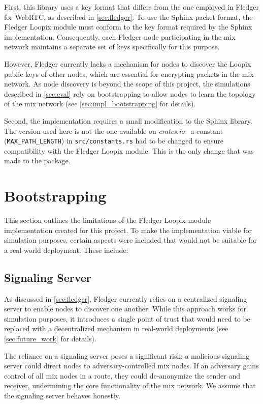 \documentclass[a4paper,11pt,oneside]{report}
\begin{document}
First, this library uses a key format that differs from the one employed in Fledger for WebRTC, as described in \autoref{sec:fledger}. To use the Sphinx packet format, the Fledger Loopix module must conform to the key format required by the Sphinx implementation. Consequently, each Fledger node participating in the mix network maintains a separate set of keys specifically for this purpose.

However, Fledger currently lacks a mechanism for nodes to discover the Loopix public keys of other nodes, which are essential for encrypting packets in the mix network. As node discovery is beyond the scope of this project, the simulations described in \autoref{sec:eval} rely on bootstrapping  to allow nodes to learn the topology of the mix network (see \autoref{sec:impl_bootstrapping} for details).

Second, the implementation requires a small modification to the Sphinx library. The version used here is not the one available on \textit{crates.io}~\cite{sphinx-packet} a constant (\texttt{MAX\_PATH\_LENGTH}) in \texttt{src/constants.rs} had to be changed to ensure compatibility with the Fledger Loopix module. This is the only change that was made to the package.

\section{Bootstrapping}
\label{sec:impl_bootstrapping}

This section outlines the limitations of the Fledger Loopix module implementation created for this project. To make the implementation viable for simulation purposes, certain aspects were included that would not be suitable for a real-world deployment. These include:

\subsection{Signaling Server}
As discussed in \autoref{sec:fledger}, Fledger currently relies on a centralized signaling server to enable nodes to discover one another. While this approach works for simulation purposes, it introduces a single point of trust that would need to be replaced with a decentralized mechanism in real-world deployments (see \autoref{sec:future_work} for details).

The reliance on a signaling server poses a significant risk: a malicious signaling server could direct nodes to adversary-controlled mix nodes. If an adversary gains control of all mix nodes in a route, they could de-anonymize the sender and receiver, undermining the core functionality of the mix network. We assume that the signaling server behaves honestly.
    
\end{document}

